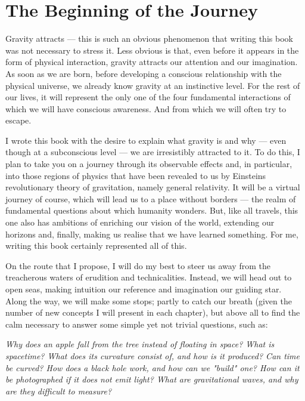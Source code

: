 
\chapter*{The Beginning of the Journey}\label{introduction}

Gravity attracts --- this is such an obvious phenomenon that writing this book was not
necessary to stress it. Less obvious is that, even before it appears in the form of
physical interaction, gravity attracts our attention and our imagination. As soon as we
are born, before developing a conscious relationship with the physical universe, we
already know gravity at an instinctive level. For the rest of our lives, it will
represent the only one of the four fundamental interactions of which we will have
conscious awareness. And from which we will often try to escape.

I wrote this book with the desire to explain what gravity is and why --- even though at
a subconscious level --- we are irresistibly attracted to it. To do this, I plan to take
you on a journey through its observable effects and, in particular, into those regions
of physics that have been revealed to us by Einstein\textquotesingle s revolutionary
theory of gravitation, namely general relativity. It will be a virtual journey of
course, which will lead us to a place without borders --- the realm of fundamental
questions about which humanity wonders. But, like all travels, this one also has
ambitions of enriching our vision of the world, extending our horizons and, finally,
making us realise that we have learned something. For me, writing this book certainly
represented all of this.

On the route that I propose, I will do my best to steer us away from the treacherous
waters of erudition and technicalities. Instead, we will head out to open seas, making
intuition our reference and imagination our guiding star. Along the way, we will make
some stops; partly to catch our breath (given the number of new concepts I will present
in each chapter), but above all to find the calm necessary to answer some simple yet not
trivial questions, such as:

\emph{Why does an apple fall from the tree instead of floating in space? What is
spacetime? What does its curvature consist of, and how is it produced? Can time be
curved? How does a black hole work, and how can we "build" one? How can it be
photographed if it does not emit light? What are gravitational waves, and why are they
difficult to measure?}


